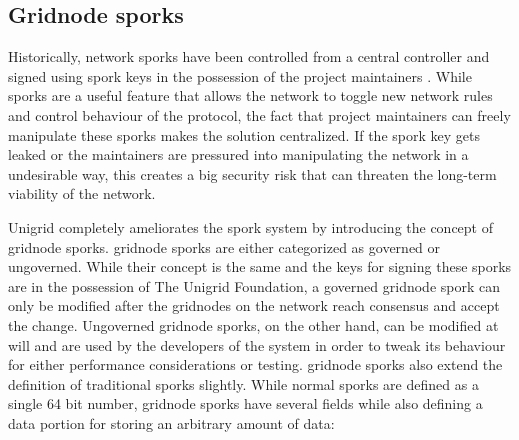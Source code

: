 \documentclass[10pt,a4paper,final]{article}
\begin{document}
\subsection{Gridnode sporks}
Historically, network sporks have been controlled from a central controller and signed using spork keys in the possession of the project maintainers \cite{dashref2017}. While sporks are a useful feature that allows the network to toggle new network rules and control behaviour of the protocol, the fact that project maintainers can freely manipulate these sporks makes the solution centralized. If the spork key gets leaked or the maintainers are pressured into manipulating the network in a undesirable way, this creates a big security risk that can threaten the long-term viability of the network.

Unigrid completely ameliorates the spork system by introducing the concept of \gls{gridnode} sporks. \Gls{gridnode} sporks are either categorized as governed or ungoverned. While their concept is the same and the keys for signing these sporks are in the possession of The Unigrid Foundation, a governed \gls{gridnode} spork can only be modified after the \glspl{gridnode} on the network reach consensus and accept the change. Ungoverned \gls{gridnode} sporks, on the other hand, can be modified at will and are used by the developers of the system in order to tweak its behaviour for either performance considerations or testing. \Gls{gridnode} sporks also extend the definition of traditional sporks slightly. While normal sporks are defined as a single 64 bit number, \gls{gridnode} sporks have several fields while also defining a data portion for storing an arbitrary amount of data:
\end{document}
